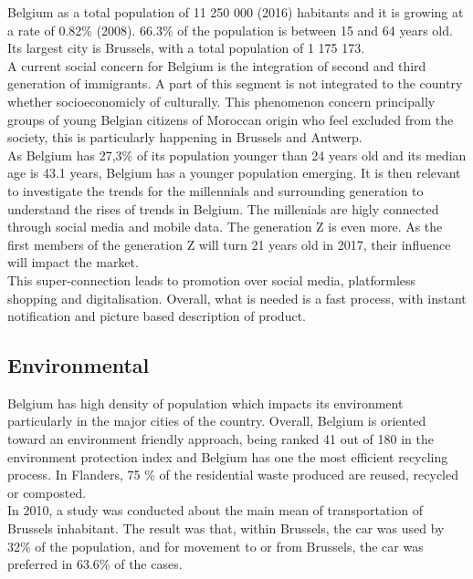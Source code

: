 \documentclass[12pt,a4paper,oneside]{book}
\begin{document}
Belgium as a total population of 11 250 000 (2016) habitants and it is growing at a rate of 0.82\% (2008). 66.3\% of the population is between 15 and 64 years old. Its largest city is Brussels, with a total population of 1 175 173\cite{ciafb}.\\

A current social concern for Belgium is the integration of second and third generation of immigrants. A part of this segment is not integrated to the country whether socioeconomicly of culturally. This phenomenon concern principally groups of young Belgian citizens of Moroccan origin who feel excluded from the society, this is particularly happening in Brussels and Antwerp\cite{sgikc}.\\

As Belgium has 27,3\% of its population younger than 24 years old and its median age is 43.1 years, Belgium has a younger population emerging\cite{ciafb}. It is then relevant to investigate the trends for the millennials and surrounding generation to understand the rises of trends in Belgium. The millenials are higly connected through social media and mobile data. The generation Z is even more. As the first members of the generation Z will turn 21 years old in 2017, their influence will impact the market.\\
This super-connection leads to promotion over social media, platformless shopping and digitalisation. Overall, what is needed is a fast process, with instant notification and picture based description of product\cite{stbe}.



\subsection{Environmental}

Belgium has high density of population which impacts its environment particularly in the major cities of the country. Overall, Belgium is oriented toward an environment friendly approach, being ranked 41 out of 180 in the environment protection index\cite{epi} and Belgium has one the most efficient recycling process. In Flanders, 75 \% of the residential waste produced are reused, recycled or composted\cite{wastemana}.\\

In 2010, a study was conducted about the main mean of transportation of Brussels inhabitant. The result was that, within Brussels, the car was used by 32\% of the population, and for movement to or from Brussels, the car was preferred in 63.6\% of the cases.\cite{mtpd}
\end{document}
